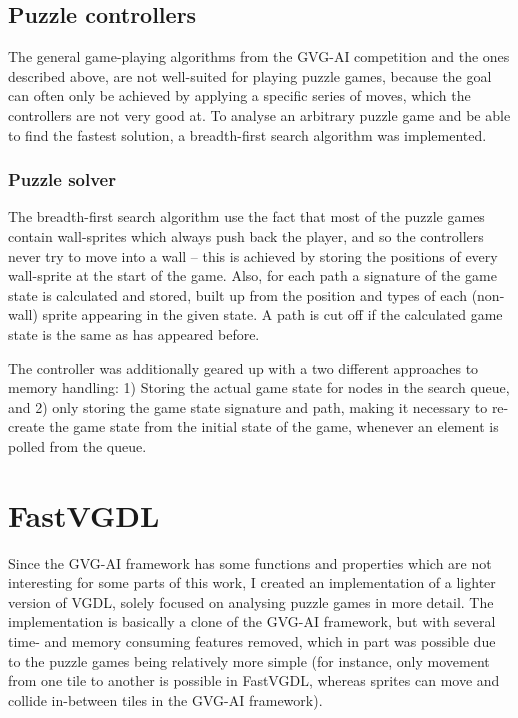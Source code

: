 \documentclass[a4paper,titlepage,final]{report}
\begin{document}
\subsection{Puzzle controllers}
The general game-playing algorithms from the GVG-AI competition and the ones described above, are not well-suited for playing puzzle games, because the goal can often only be achieved by applying a specific series of moves, which the controllers are not very good at.
To analyse an arbitrary puzzle game and be able to find the fastest solution, a breadth-first search algorithm was implemented.

\subsubsection*{Puzzle solver}
The breadth-first search algorithm use the fact that most of the puzzle games contain wall-sprites which always push back the player, and so the controllers never try to move into a wall -- this is achieved by storing the positions of every wall-sprite at the start of the game. 
Also, for each path a signature of the game state is calculated and stored, built up from the position and types of each (non-wall) sprite appearing in the given state. 
A path is cut off if the calculated game state is the same as has appeared before.

The controller was additionally geared up with a two different approaches to memory handling: 1) Storing the actual game state for nodes in the search queue, and 2) only storing the game state signature and path, making it necessary to re-create the game state from the initial state of the game, whenever an element is polled from the queue.


\section{FastVGDL}
\label{sec_fastvgdl}
Since the GVG-AI framework has some functions and properties which are not interesting for some parts of this work, I created an implementation of a lighter version of VGDL, solely focused on analysing puzzle games in more detail.
The implementation is basically a clone of the GVG-AI framework, but with several time- and memory consuming features removed, which in part was possible due to the puzzle games being relatively more simple (for instance, only movement from one tile to another is possible in FastVGDL, whereas sprites can move and collide in-between tiles in the GVG-AI framework).
\end{document}
